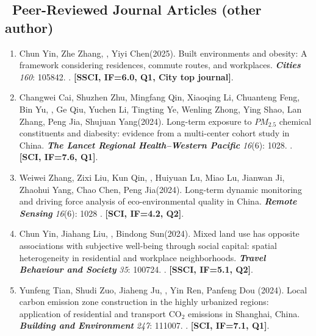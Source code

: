 \subsection*{\texorpdfstring{\faBook\ Peer-Reviewed Journal Articles (other author)}{Other Peer-Reviewed Journal Articles (other author)}}
\begin{enumerate}
\item
    Chun Yin\CS, Zhe Zhang, \Shaoqing, Yiyi Chen\CS (2025).
    Built environments and obesity: A framework considering residences, commute routes, and workplaces.
    \textbf{\textit{Cities}} \textit{160}: 105842.
    . \textbf{[SSCI, IF=6.0, Q1, City top journal]}.
\item
    Changwei Cai\CF, Shuzhen Zhu\CF, Mingfang Qin\CF, Xiaoqing Li\CF, Chuanteng Feng, Bin Yu, \Shaoqing, Ge Qiu, Yuchen Li, Tingting Ye, Wenling Zhong, Ying Shao, Lan Zhang, Peng Jia\CS, Shujuan Yang\CS (2024).
    Long-term exposure to $PM_{2.5}$ chemical constituents and diabesity: evidence from a multi-center cohort study in China. 
    \textbf{\textit{The Lancet Regional Health–Western Pacific}} \textit{16}(6): 1028.
    . \textbf{[SCI, IF=7.6, Q1]}.
\item
    Weiwei Zhang, Zixi Liu, Kun Qin, \Shaoqing, Huiyuan Lu, Miao Lu, Jianwan Ji, Zhaohui Yang, Chao Chen, Peng Jia\CS (2024).
    Long-term dynamic monitoring and driving force analysis of eco-environmental quality in China. 
    \textbf{\textit{Remote Sensing}} \textit{16}(6): 1028
    . \textbf{[SCI, IF=4.2, Q2]}.
\item
    Chun Yin, Jiahang Liu, \Shaoqing, Bindong Sun\CS (2024).
    Mixed land use has opposite associations with subjective well-being through social capital: spatial heterogeneity in residential and workplace neighborhoods.
    \textbf{\textit{Travel Behaviour and Society}} \textit{35}: 100724.
    . \textbf{[SSCI, IF=5.1, Q2]}.
\item
    Yunfeng Tian, Shudi Zuo\CS, Jiaheng Ju, \Shaoqing, Yin Ren, Panfeng Dou (2024).
    Local carbon emission zone construction in the highly urbanized regions: application of residential and transport CO$_2$ emissions in Shanghai, China.
    \textbf{\textit{Building and Environment}} \textit{247}: 111007.
    . \textbf{[SCI, IF=7.1, Q1]}.

\end{enumerate}
